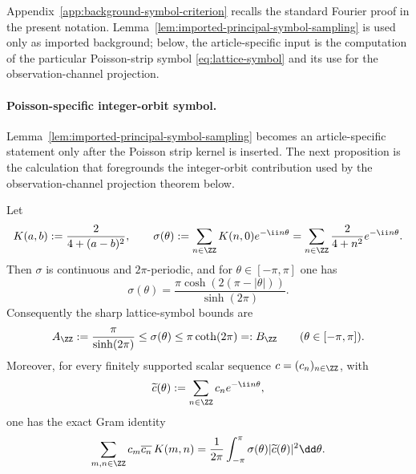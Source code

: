 Appendix~\ref{app:background-symbol-criterion} recalls the standard Fourier
proof in the present notation.  Lemma~\ref{lem:imported-principal-symbol-sampling}
is used only as imported background; below, the article-specific input is the
computation of the particular Poisson-strip symbol \eqref{eq:lattice-symbol}
and its use for the observation-channel projection.
\fi

\paragraph{Poisson-specific integer-orbit symbol.}
Lemma~\ref{lem:imported-principal-symbol-sampling} becomes an
article-specific statement only after
the Poisson strip kernel is inserted.  The next proposition is the calculation
that foregrounds the integer-orbit contribution used by the observation-channel
projection theorem below.

\begin{proposition}%
\label{prop:poisson-lattice-symbol}
Let
\[
K(a,b):=\frac{2}{4+(a-b)^2},
\qquad
\sigma(\theta):=\sum_{n\in\ZZ}K(n,0)e^{-\ii n\theta}
=\sum_{n\in\ZZ}\frac{2}{4+n^2}e^{-\ii n\theta}.
\]
Then $\sigma$ is continuous and $2\pi$-periodic, and for
$\theta\in[-\pi,\pi]$ one has
\begin{equation}\label{eq:lattice-symbol}
\sigma(\theta)
=\frac{\pi\cosh(2(\pi-|\theta|))}{\sinh(2\pi)}.
\end{equation}
Consequently the sharp lattice-symbol bounds are
\[
A_{\ZZ}:=\frac{\pi}{\sinh(2\pi)}
\le
\sigma(\theta)
\le
\pi\coth(2\pi)=:B_{\ZZ}
\qquad(\theta\in[-\pi,\pi]).
\]
Moreover, for every finitely supported scalar sequence
$c=(c_n)_{n\in\ZZ}$, with
\[
\widetilde c(\theta):=\sum_{n\in\ZZ}c_ne^{-\ii n\theta},
\]
one has the exact Gram identity
\begin{equation}\label{eq:lattice-symbol-form}
\sum_{m,n\in\ZZ}c_m\overline{c_n}\,K(m,n)
=\frac{1}{2\pi}\int_{-\pi}^{\pi}
\sigma(\theta)|\widetilde c(\theta)|^2\dd\theta .
\end{equation}
\end{proposition}


